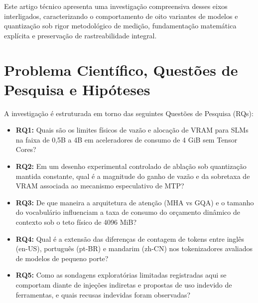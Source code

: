 \documentclass[10pt,a4paper,twocolumn]{article}
\begin{document}
Este artigo t\'ecnico apresenta uma investiga\c{c}\~ao compreensiva desses eixos interligados, caracterizando o comportamento de oito variantes de modelos e quantiza\c{c}\~ao sob rigor metodol\'ogico de medi\c{c}\~ao, fundamenta\c{c}\~ao matem\'atica expl\'icita e preserva\c{c}\~ao de rastreabilidade integral.

\section{Problema Cient\'ifico, Quest\~oes de Pesquisa e Hip\'oteses}

A investiga\c{c}\~ao \'e estruturada em torno das seguintes Quest\~oes de Pesquisa (RQs):
\begin{itemize}[leftmargin=2em,itemsep=0.2em]
    \item \textbf{RQ1:} Quais s\~ao os limites f\'isicos de vaz\~ao e aloca\c{c}\~ao de VRAM para SLMs na faixa de 0,5B a 4B em aceleradores de consumo de 4 GiB sem Tensor Cores?
    \item \textbf{RQ2:} Em um desenho experimental controlado de abla\c{c}\~ao sob quantiza\c{c}\~ao mantida constante, qual \'e a magnitude do ganho de vaz\~ao e da sobretaxa de VRAM associada ao mecanismo especulativo de MTP?
    \item \textbf{RQ3:} De que maneira a arquitetura de aten\c{c}\~ao (MHA vs GQA) e o tamanho do vocabul\'ario influenciam a taxa de consumo do or\c{c}amento din\^amico de contexto sob o teto f\'isico de 4096 MiB?
    \item \textbf{RQ4:} Qual \'e a extens\~ao das diferen\c{c}as de contagem de tokens entre ingl\^es (en-US), portugu\^es (pt-BR) e mandarim (zh-CN) nos tokenizadores avaliados de modelos de pequeno porte?
    \item \textbf{RQ5:} Como as sondagens explorat\'orias limitadas registradas aqui se comportam diante de inje\c{c}\~oes indiretas e propostas de uso indevido de ferramentas, e quais recusas indevidas foram observadas?
\end{itemize}
\end{document}
